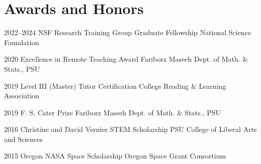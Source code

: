 \section{Awards and Honors}

\cventry
{2022--2024}
{NSF Research Training Group Graduate Fellowship}
{National Science Foundation}
{}
{}
{}

\cventry
{2020}
{Excellence in Remote Teaching Award}
{Fariborz Maseeh Dept. of Math. \& Stats., PSU}
{}
{}
{}

\cventry
{2019}
{Level III (Master) Tutor Certification}
{College Reading \& Learning Association}
{}
{}
{}

\cventry
{2019}
{F. S. Cater Prize}
{Fariborz Maseeh Dept. of Math. \& Stats., PSU}
{}
{}
{}

\cventry
{2016}
{Christine and David Vernier STEM Scholarship}
{PSU College of Liberal Arts and Sciences}
{}
{}
{}

\cventry
{2015}
{Oregon NASA Space Scholarship}
{Oregon Space Grant Consortium}
{}
{}
{}
